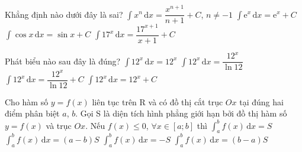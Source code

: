 \begin{ex}%
	Khẳng  định nào dưới đây là sai?
	 \choice
		{$\displaystyle\int x^n\mathrm{\,d}x=\dfrac{x^{n+1}}{n+1}+C$,  $n\neq -1$}
		 {$\displaystyle\int \mathrm{e}^x\mathrm{\,d}x=\mathrm{e}^x+C$}
		{$\displaystyle\int \cos x\mathrm{\,d}x=\sin x+C$} 
		{\True  $\displaystyle\int 17^x\mathrm{\,d}x=\dfrac{17^{x+1}}{x+1}+C$}
\end{ex}

\begin{ex}%
	Phát biểu  nào sau đây là đúng?
	\choice 
		{$\displaystyle\int  12^x\mathrm{\,d}x=12^x$}
		{$\displaystyle\int 12^x\mathrm{\,d}x=\dfrac{12^x}{\ln  12}$}
		{\True $\displaystyle\int 12^x\mathrm{\,d}x=\dfrac{12^x}{\ln 12}+C$} 
		{$\displaystyle\int 12^x\mathrm{\,d}x=12^x+C$} 
\end{ex}

\begin{ex}%
	 Cho hàm số $y=f(x)$ liên tục trên $\mathrm{R}$ và có đồ thị cắt trục $Ox$ tại đúng hai điểm phân biệt $a$, $b$. Gọi S là diện tích hình phẳng giới hạn bởi đồ thị hàm số $y=f(x)$ và trục $Ox$. Nếu $f(x)\le 0$, $\forall x\in \left[a;b \right]$ thì
	\choice 
		{$\displaystyle\int_a^b  f(x)\mathrm{\,d}x =S$}
		{$\displaystyle\int_a^b f(x)\mathrm{\,d}x  =(a-b)S$}
		{\True  $\displaystyle\int_a^b f(x)\mathrm{\,d}x =-S$}
		{$\displaystyle\int_a^b f(x)\mathrm{\,d}x  =(b-a)S$}
\end{ex}

